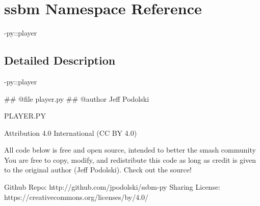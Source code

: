 \hypertarget{namespacessbm}{}\section{ssbm Namespace Reference}
\label{namespacessbm}


-\/py\+::player  




\subsection{Detailed Description}
-\/py\+::player 

\begin{DoxyVerb}## @file player.py
## @author Jeff Podolski


PLAYER.PY

Attribution 4.0 International (CC BY 4.0)

All code below is free and open source, intended to better the smash community
You are free to copy, modify, and redistribute this code as long as credit
is given to the original author (Jeff Podolski). Check out the source!

Github Repo: http://github.com/jpodolski/ssbm-py
Sharing License: https://creativecommons.org/licenses/by/4.0/\end{DoxyVerb}
 